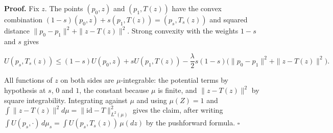 \documentclass[11pt,a4paper]{report}
\begin{document}
\textbf{Proof.} Fix \(z\). The points \((p_0,z)\) and \((p_1,T(z))\) have the convex combination \((1-s)(p_0,z)+s(p_1,T(z))=(p_s,T_s(z))\) and squared distance \(\|p_0-p_1\|^2+\|z-T(z)\|^2\). Strong convexity with the weights \(1-s\) and \(s\) gives


\[U(p_s,T_s(z))\le(1-s)U(p_0,z)+sU(p_1,T(z))-\frac\lambda2s(1-s)\bigl(\|p_0-p_1\|^2+\|z-T(z)\|^2\bigr).\]


All functions of \(z\) on both sides are \(\mu\)-integrable: the potential terms by hypothesis at \(s\), \(0\) and \(1\), the constant because \(\mu\) is finite, and \(\|z-T(z)\|^2\) by square integrability. Integrating against \(\mu\) and using \(\mu(Z)=1\) and \(\int\|z-T(z)\|^2d\mu=\|\mathrm{id}-T\|_{L^2(\mu)}^2\) gives the claim, after writing \(\int U(p_s,\cdot)\,d\mu_s=\int U(p_s,T_s(z))\,\mu(dz)\) by the pushforward formula. \(\square\)
\end{document}
